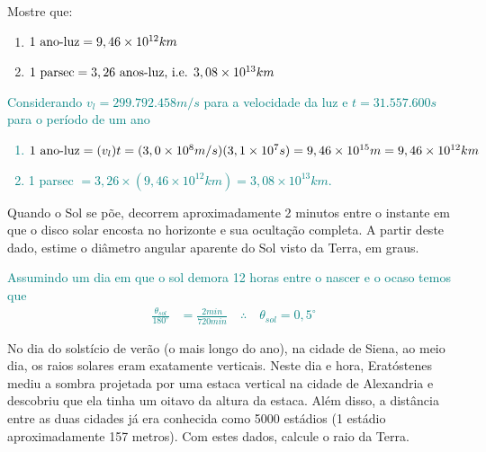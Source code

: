 \begin{prob}
	Mostre que:
	\begin{enumerate}[label=\alph *)]
		\item $1\textnormal{ ano-luz}=9,46\times 10^{12}km$
		\item $1\textnormal{ parsec}=3,26\textnormal{ anos-luz, i.e. }3,08\times10^{13}km$
	\end{enumerate}	
\end{prob}


\begin{sol}
	\textcolor{teal} {
		Considerando $v_l=299.792.458m/s$ para a velocidade da luz e $t=31.557.600s$ para o período de um ano
		\begin{enumerate}[label=\alph *)]
			\item $1\textnormal{ ano-luz}=(v_l)t=(3,0\times 10^{8}m/s)(3,1\times 10^{7}s)=9,46\times 10^{15}m=9,46\times 10^{12}km$
			\item 1 parsec $=3,26\times(9,46\times 10^{12}km)=3,08\times10^{13}km.$
		\end{enumerate}
	}	
\end{sol}

\begin{prob}
	Quando o Sol se põe, decorrem aproximadamente 2 minutos entre o instante em que o disco solar encosta no horizonte e sua ocultação completa. A partir deste dado, estime o diâmetro angular aparente do Sol visto da Terra, em graus.
\end{prob}

\begin{sol}
	\textcolor {teal} {
		Assumindo um dia em que o sol demora 12 horas entre o nascer e o ocaso temos que
		\begin{align}
			\frac{\theta_{sol}}{180^{\circ}}&=\frac{2min}{720min}\quad \therefore\quad\theta_{sol}=0,5^{\circ}			
		\end{align}
	}
\end{sol}

\begin{prob}
	No dia do solstício de verão (o mais longo do ano), na cidade de Siena, ao meio dia, os raios solares eram exatamente verticais. Neste dia e hora, Eratóstenes mediu a sombra projetada por uma
	estaca vertical na cidade de Alexandria e descobriu que ela tinha um oitavo da altura da estaca. Além disso, a distância entre as duas cidades já era conhecida como 5000 estádios (1 estádio aproximadamente 157 metros). Com estes dados, calcule o raio da Terra.
\end{prob}


